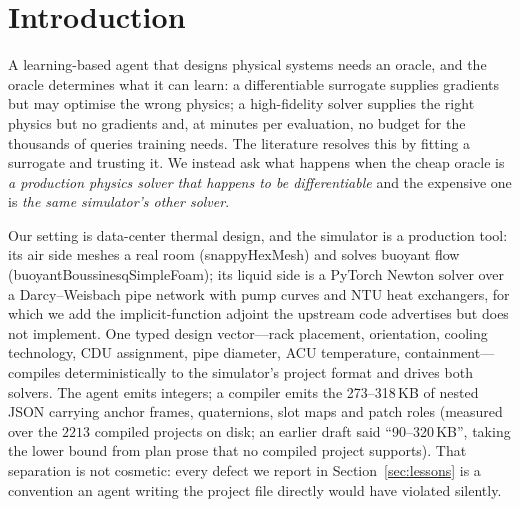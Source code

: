 \documentclass{article}
\newcommand{\Jair}{J_{\mathrm{air}}}
\begin{document}
\begin{abstract}
$0.750$ to $0.375$.  The coupled arm also held the larger physics budget ($32$
against $16$ forward solves per step), so that mismatch runs against its result rather than
explaining it.  The two blocks fail for different \emph{measured} reasons:
on diameter the adjoint is correctly signed on every one of the six coordinates that
separate the search from that constant and the search simply runs out of steps, while on
assignment half the coordinates are physically inert.  Exactness is not usefulness, and
the ranking diagnostic does not predict this---it rated diameter $\rho = 1.000$.  On
$\Jair$ alone the screen wins $0$ of $8$: the exact adjoint buys what it measures and
nothing more.  The exchange rate between the two objectives is not identified by
these data ($93.1$ by direct regression against $180.4$ by inverse, a factor of
$1.94$ that is exactly $1/R^2$), so no scalarized result is claimed.  Every figure
is rendered by the simulator's own web frontend, the appendix is generated from
record files by a committed script, and the forty-two defects this campaign found in
itself are published with the measurements that withdrew them.
\end{abstract}

\section{Introduction}
\label{sec:intro}

A learning-based agent that designs physical systems needs an oracle, and the oracle
determines what it can learn: a differentiable surrogate supplies gradients but may
optimise the wrong physics; a high-fidelity solver supplies the right physics but no
gradients and, at minutes per evaluation, no budget for the thousands of queries
training needs.  The literature resolves this by fitting a surrogate and trusting it.
We instead ask what happens when the cheap oracle is \emph{a production physics solver
that happens to be differentiable} and the expensive one is \emph{the same simulator's
other solver}.

Our setting is data-center thermal design, and the simulator is a production tool: its
air side meshes a real room (snappyHexMesh) and solves buoyant flow
(buoyantBoussinesqSimpleFoam); its liquid side is a PyTorch Newton solver over a
Darcy--Weisbach pipe network with pump curves and NTU heat exchangers, for which we add
the implicit-function adjoint the upstream code advertises but does not implement.  One
typed design vector---rack placement, orientation, cooling technology, CDU assignment,
pipe diameter, ACU temperature, containment---compiles deterministically to the
simulator's project format and drives both solvers.  The agent emits integers; a
compiler emits the 273--318\,KB of nested JSON carrying anchor frames, quaternions, slot
maps and patch roles (measured over the $2213$ compiled projects on disk; an earlier
draft said ``90--320\,KB'', taking the lower bound from plan prose that no compiled
project supports).  That separation is not cosmetic: every defect we report in
Section~\ref{sec:lessons} is a convention an agent writing the project file directly
would have violated silently.
\end{document}
